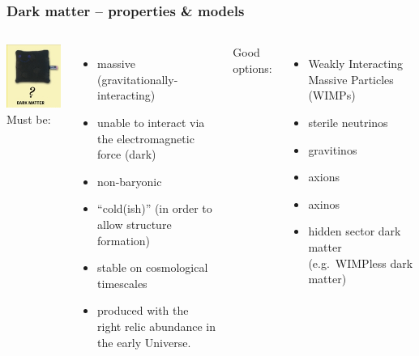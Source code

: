 \documentclass[xcolor=dvipsnames]{beamer}
\begin{document}
\begin{frame}
  \frametitle{Dark matter -- properties \& models}
  \begin{columns}[T]
	\includegraphics[width=\linewidth]{DM}
	\alert<1-2>{Must be:}
        \begin{itemize}
        \footnotesize
	\item massive (gravitationally-interacting)
        \item unable to interact via the electromagnetic force (dark)
        \item non-baryonic
        \item ``cold(ish)'' (in order to allow structure formation) 
        \item stable on cosmological timescales
        \item \alert<3>{produced with the right relic abundance in the early Universe}.\\\vspace{2mm}
	\end{itemize}
        \alert<1-2>{Good options:}
        \begin{itemize}
        \footnotesize
        \item \alert<3>{Weakly Interacting Massive Particles (WIMPs)}
        \item sterile neutrinos
        \item gravitinos
        \item axions
        \item axinos
        \item hidden sector dark matter (e.g.~WIMPless dark matter)
        \end{itemize}
  \end{columns}


\end{frame}
\end{document}
